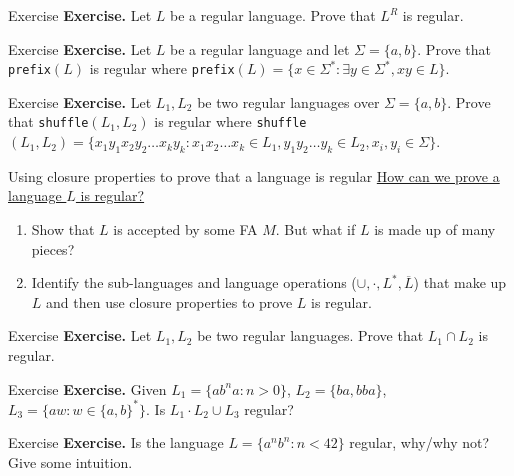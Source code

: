 \documentclass[10pt]{beamer}
\begin{document}
\begin{frame}[t]{Exercise}
    \textbf{Exercise.} Let $L$ be a regular language. Prove that $L^R$ is regular.
\end{frame}

\begin{frame}[t]{Exercise}
    \textbf{Exercise.} Let $L$ be a regular language and let $\Sigma=\{a,b\}$. Prove that \texttt{prefix}$(L)$ is regular where \texttt{prefix}$(L) = \{x \in \Sigma^* : \exists y \in \Sigma^*, xy \in L\}$.
\end{frame}

\begin{frame}[t]{Exercise}
    \textbf{Exercise.} Let $L_1, L_2$ be two regular languages over $\Sigma=\{a, b\}$. Prove that \texttt{shuffle}$(L_1, L_2)$ is regular where \texttt{shuffle}$(L_1, L_2) = \{x_1y_1x_2y_2 \dots x_ky_k : x_1x_2\dots x_k \in L_1, y_1y_2\dots y_k \in L_2, x_i, y_i \in \Sigma\}$.
\end{frame}

\begin{frame}{Using closure properties to prove that a language is regular}
    \underline{How can we prove a language $L$ is regular?}
    \begin{enumerate}
        \item Show that $L$ is accepted by some FA $M$. But what if $L$ is made up of many pieces?
        \item Identify the sub-languages and language operations ($\cup, \cdot, {L}^*, \overline{L}$) that make up $L$ and then use closure properties to prove $L$ is regular.
    \end{enumerate}
\end{frame}

\begin{frame}[t]{Exercise}
    \textbf{Exercise.} Let $L_1, L_2$ be two regular languages. Prove that $L_1 \cap L_2$ is regular.
\end{frame}

\begin{frame}[t]{Exercise}
    \textbf{Exercise.} Given $L_1 = \{ab^na: n > 0\}$, $L_2 = \{ba, bba\}$, $L_3 = \{aw : w \in \{a,b\}^* \}$. Is $L_1 \cdot L_2 \cup L_3$ regular?
\end{frame}

\begin{frame}[t]{Exercise}
    \textbf{Exercise.} Is the language $L = \{a^nb^n: n < 42\}$ regular, why/why not? Give some intuition.
\end{frame}
\end{document}

